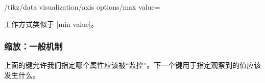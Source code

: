 \begin{key}{/tikz/data visualization/axis options/max value=} %

    工作方式类似于 |min value|。
\end{key}


\subsubsection{缩放：一般机制}


上面的键允许我们指定哪个属性应该被``监控''。下一个键用于指定观察到的值应该发生什么。

